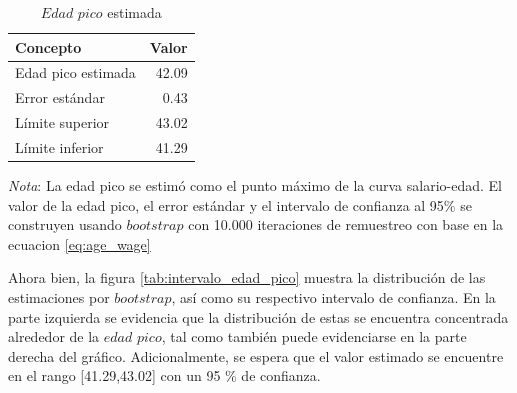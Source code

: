 \documentclass[12pt,a4paper,onecolumn]{article}
\begin{document}
\begin{table}[ht]
\caption{$Edad$ $pico$ estimada}
\label{tab:edad_pico_estimada} 
\centering
\begin{tabular}{lr}
  \hline
  Concepto & Valor \\ 
  \hline
Edad pico estimada & 42.09 \\ 
Error estándar & 0.43 \\ 
Límite superior  & 43.02 \\ 
Límite inferior & 41.29 \\ 
   \hline
\end{tabular}
\vspace{0.5cm}
\begin{minipage}{0.7\textwidth}  
\footnotesize \scriptsize { \textit{Nota}: La edad pico se estimó como el punto máximo de la curva salario-edad. El valor de la edad pico, el error estándar y el intervalo de confianza al 95\% se construyen usando $bootstrap$ con 10.000 iteraciones de remuestreo con base en la ecuacion \ref{eq:age_wage}}
\end{minipage}
\end{table}
Ahora bien, la figura \ref{tab:intervalo_edad_pico} muestra la distribución de las estimaciones por $bootstrap$, así como su respectivo intervalo de confianza. En la parte izquierda se evidencia que la distribución de estas se encuentra concentrada alrededor de la $edad$ $pico$, tal como también puede evidenciarse en la parte derecha del gráfico. Adicionalmente, se espera que el valor estimado se encuentre en el rango [41.29,43.02] con un 95 \% de confianza. 
\end{document}
